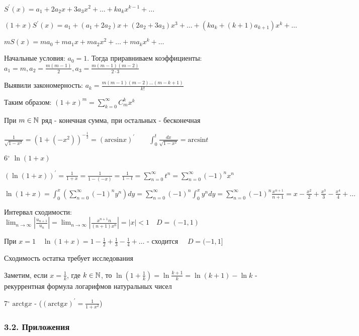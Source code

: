 \documentclass[12pt]{article}
\begin{document}
    $S^\prime(x) = a_1 + 2a_2 x + 3a_3 x^2 + \dots + k a_k x^{k - 1} + \dots$

    $(1 + x) S^\prime(x) = a_1 + (a_1 + 2a_2)x + (2a_2 + 3a_3) x^3 + \dots + (k a_k + (k + 1) a_{k + 1})x^k + \dots$

    $mS(x) = ma_0 + ma_1 x + ma_2 x^2 + \dots + m a_k x^k + \dots$

    Начальные условия: $a_0 = 1$. Тогда приравниваем коэффициенты: $a_1 = m, a_2 = \frac{m(m - 1)}{2}, a_3 = \frac{m(m - 1)(m - 2)}{2 \cdot 3}$

    Выявили закономерность: $a_k = \frac{m(m - 1)(m - 2)\dots(m - k + 1)}{k!}$

    Таким образом: $(1 + x)^m = \sum_{k = 0}^\infty C_m^k x^k$

    При $m \in \mathbb{N}$ ряд - конечная сумма, при остальных - бесконечная

    \Lab $\frac{1}{\sqrt{1 - x^2}} = (1 + (-x^2))^{-\frac{1}{2}} = (\mathrm{arcsin} x)^\prime \qquad \int_0^t \frac{dx}{\sqrt{1 - x^2}} = \mathrm{arcsin} t$

    \mediumvspace

    6$^\circ$ $\ln(1 + x)$

    $(\ln(1 + x))^\prime = \frac{1}{1 + x} = \frac{1}{1 - (-x)} = \frac{1}{1 - t} = \sum_{n = 0}^\infty t^n = 
    \sum_{n = 0}^\infty (-1)^n x^n$

    $\ln(1 + x) = \int_0^x (\sum_{n = 0}^\infty (-1)^n y^n) dy = \sum_{n = 0}^\infty (-1)^n \int_0^x y^n dy = 
    \sum_{n = 0}^\infty (-1)^n \frac{x^{n + 1}}{n + 1} = x - \frac{x^2}{2} + \frac{x^3}{3} - \frac{x^4}{4} + \dots$
    
    Интервал сходимости: $\lim_{n \to \infty} \left|\frac{u_{n + 1}}{u_n}\right| = 
    \lim_{n \to \infty} \left|\frac{x^{n + 1} n}{(n + 1) x^n}\right| = |x| < 1 \quad D = (-1, 1)$

    При $x = 1 \quad \ln(1 + x) = 1 - \frac{1}{2} + \frac{1}{3} - \frac{1}{4} + \dots$ - сходится $\quad D = (-1, 1]$

    \Notas Сходимость остатка требует исследования

    \Nota Заметим, если $x = \frac{1}{k}$, где $k \in \mathbb{N}$, то $\ln(1 + \frac{1}{k}) = \ln\frac{k + 1}{k} = \ln (k + 1) - \ln k$ - рекуррентная формула
    логарифмов натуральных чисел

    \mediumvspace

    7$^\circ$ $\mathrm{arctg} x$ - \Lab ($(\mathrm{arctg} x)^\prime = \frac{1}{1 + x^2}$)

    \subsubsection{3.2. Приложения}
\end{document}
